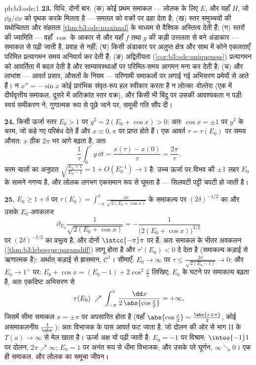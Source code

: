 \begin{solution}{pb:b3:ode:1}
\textbf{23.} विधि, दोनों बार: (क) कोई प्रथम समाकल --- लोलक के लिए
$E$, और यहाँ $H$, जो $\dd y/\dd x$ को पृथक करके मिलता है --- समतल को
वक्रों पर ढहा देता है; (ख) स्तर समुच्चयों की यथोचितता और संहतता
\cref{thm:b3:ode:maximal} के माध्यम से वैश्विक अस्तित्व देती हैं; (ग) स्तरों की ज्यामिति
--- वहाँ $\cos$ के आकार से और यहाँ $f$ तथा $g$ की कड़ी उत्तलता
से बने अंडाकार --- समाकल से पढ़ी जाती है, प्रवाह से नहीं; (घ) किसी
 अंडाकार पर अलुप्त क्षेत्र और साथ में  कोने एकलताएँ
परिमित प्रत्यागमन समय अनिवार्य कर देती हैं; (ङ) अद्वितीयता (\cref{cor:b3:ode:uniqueness})
प्रत्यागमन को आवर्तिता में बदल देती है और साम्यावस्थाओं पर परिमित-समय
आगमन मना कर देती है; (च) और लाभांश --- आवर्त प्रसार, औसतों के नियम
--- परिणामी समाकलों पर लगाई गई अभिसरण प्रमेयों से आते हैं। न $x'' = -\sin x$
कोई प्रारंभिक संवृत-रूप हल स्वीकार करता है न लोत्का--वोल्तेरा (एक
में दीर्घवृत्तीय समाकल, दूसरे में अतिक्रांत स्तर वक्र), और किसी भी
बिंदु पर उसकी आवश्यकता न पड़ी: स्वयं समीकरण ने, गुणात्मक रूप से
पूछे जाने पर, समूची गति सौंप दी।

\textbf{24.} किसी ऊर्जा स्तर $E_0 > 1$ पर $y^2 = 2(E_0 +
\cos x) > 0$: अतः $\cos x = \pm1$ पर $y^2$ के
चरम, जो कहे गए परिबंध देते हैं और $x \equiv 0, \pi$ पर प्राप्त होते हैं। एक
आवर्त $\tau = \tau(E_0)$ पर समय औसत: $x$ ठीक $2\pi$ भर आगे बढ़ता है, अतः
\[
\frac1\tau\int_0^\tau y\,\dd t = \frac{x(\tau) -
x(0)}{\tau} = \frac{2\pi}\tau .
\]
चरम चालों का अनुपात $\sqrt{\frac{E_0 + 1}{E_0 -
1}} = 1 + O(E_0^{-1}) \to 1$ है: उच्च ऊर्जा पर विभव की $\pm1$ लहर $E_0$
के सामने नगण्य है, और लोलक लगभग एकसमान रूप से घूमता है --- सिलवटी
पट्टी चपटी हो जाती है।

\textbf{25.} $E_0 \geq 1 + \delta$ पर $\tau(E_0) = \int_{-\pi}^{\pi}\frac{\dd x}{\sqrt{2(E_0 +
\cos x)}}$ के समाकल्य पर $(2\delta)^{-1/2}$ का और उसके
$E_0$-अवकलज
\[
\partial_{E_0}\frac1{\sqrt{2(E_0 + \cos x)}}
= -\frac{1}{\bigl(2(E_0 + \cos x)\bigr)^{3/2}}
\]
पर $(2\delta)^{-3/2}$ का प्रभुत्व है, और दोनों  $\intcc{-\pi}\pi$ पर  हैं: अतः
समाकल के भीतर अवकलन (\cref{thm:b3:lebesgue:paramdiff}) लागू होता है और $\tau'(E_0) < 0$ दे देता है (समाकल्य
कड़ाई से ऋणात्मक है): अर्थात् कड़ाई से ह्रासमान, $\mathcal C^1$। सीमाएँ: $E_0 \to
\infty$
पर $\tau \leq \frac{2\pi}{\sqrt{2(E_0 - 1)}} \to 0$; और $E_0 \to 1^+$ पर: $E_0 + \cos x = (E_0 - 1) +
2\cos^2\frac x2$ लिखिए; $E_0$ के घटने पर समाकल्य बढ़ता
है, अतः एकदिष्ट अभिसरण से
\[
\tau(E_0) \;\nearrow\;
\int_{-\pi}^{\pi}\frac{\dd x}{2\,\abs{\cos\frac x2}}
= +\infty,
\]
जिसमें सीमा समाकल $x = \pm\pi$ पर अपसारित होता है (वहाँ $\abs{\cos\frac x2} \sim \frac{\abs{x \mp \pi}}2$, कोई
असमाकलनीय $\frac1{\abs\cdot}$): अतः विभाजक के पास आवर्त फट जाता है, जो दोलन की ओर
से भाग II के $T(a) \to
\infty$ से मेल खाता है। ऊर्जा अक्ष यों पढ़ी जाती है: $E_0 = -1$
पर विश्राम; $\intoo{-1}1$ पर दोलन, $2\pi \nearrow
\infty$; $E_0 = 1$ पर अनंत रूप से धीमा विभाजक;
और उसके परे घूर्णन, $\infty \searrow 0$। एक ही समाकल, और लोलक का समूचा जीवन।
\end{solution}
